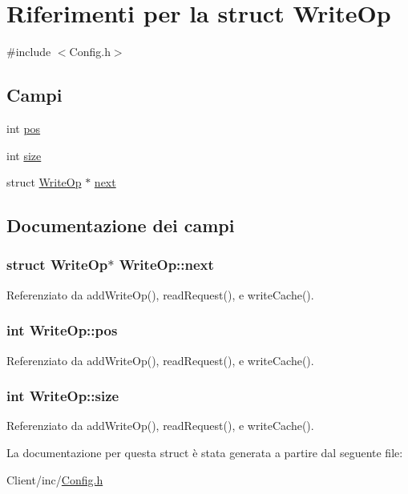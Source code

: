 \hypertarget{structWriteOp}{\section{Riferimenti per la struct Write\+Op}
\label{structWriteOp}
}


{\ttfamily \#include $<$Config.\+h$>$}

\subsection*{Campi}
\begin{DoxyCompactItemize}
\item 
int \hyperlink{structWriteOp_a0cd1c3d781c93b6feaaa5d01606fdc3d}{pos}
\item 
int \hyperlink{structWriteOp_af804d8a1e3d428ee7275b5e4f467d23a}{size}
\item 
struct \hyperlink{structWriteOp}{Write\+Op} $\ast$ \hyperlink{structWriteOp_ab10157ced397c43b41d1e77a6372a43c}{next}
\end{DoxyCompactItemize}


\subsection{Documentazione dei campi}
\hypertarget{structWriteOp_ab10157ced397c43b41d1e77a6372a43c}{
\subsubsection[{next}]{\setlength{\rightskip}{0pt plus 5cm}struct {\bf Write\+Op}$\ast$ Write\+Op\+::next}}\label{structWriteOp_ab10157ced397c43b41d1e77a6372a43c}


Referenziato da add\+Write\+Op(), read\+Request(), e write\+Cache().

\hypertarget{structWriteOp_a0cd1c3d781c93b6feaaa5d01606fdc3d}{
\subsubsection[{pos}]{\setlength{\rightskip}{0pt plus 5cm}int Write\+Op\+::pos}}\label{structWriteOp_a0cd1c3d781c93b6feaaa5d01606fdc3d}


Referenziato da add\+Write\+Op(), read\+Request(), e write\+Cache().

\hypertarget{structWriteOp_af804d8a1e3d428ee7275b5e4f467d23a}{
\subsubsection[{size}]{\setlength{\rightskip}{0pt plus 5cm}int Write\+Op\+::size}}\label{structWriteOp_af804d8a1e3d428ee7275b5e4f467d23a}


Referenziato da add\+Write\+Op(), read\+Request(), e write\+Cache().



La documentazione per questa struct è stata generata a partire dal seguente file\+:\begin{DoxyCompactItemize}
\item 
Client/inc/\hyperlink{Client_2inc_2Config_8h}{Config.\+h}\end{DoxyCompactItemize}
